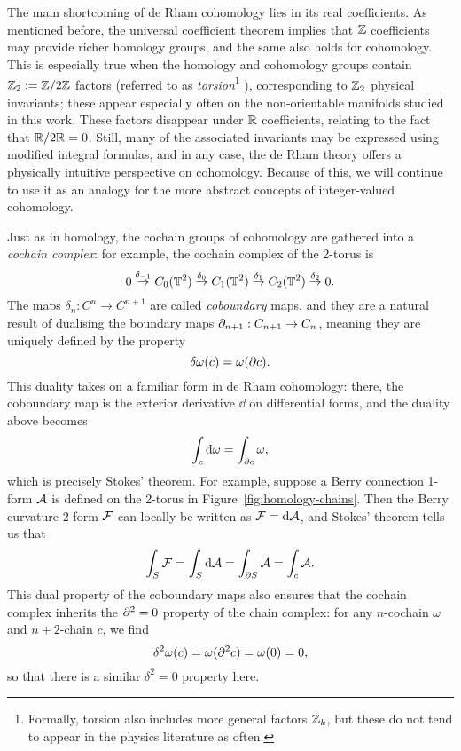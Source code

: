 The main shortcoming of de Rham cohomology lies in its real coefficients. As mentioned before, the universal coefficient theorem implies that $\mathbb{Z}$ coefficients may provide richer homology groups, and the same also holds for cohomology. This is especially true when the homology and cohomology groups contain $\mathbb{Z}_2 := \mathbb{Z}/2\mathbb{Z}$ factors (referred to as \emph{torsion}\footnote{
	Formally, torsion also includes more general factors $\mathbb{Z}_k$, but these do not tend to appear in the physics literature as often.}
), corresponding to $\mathbb{Z}_2$ physical invariants; these appear especially often on the non-orientable manifolds studied in this work. These factors disappear under $\mathbb{R}$ coefficients, relating to the fact that $\mathbb{R}/2\mathbb{R} = 0$. Still, many of the associated invariants may be expressed using modified integral formulas, and in any case, the de Rham theory offers a physically intuitive perspective on cohomology. Because of this, we will continue to use it as an analogy for the more abstract concepts of integer-valued cohomology.

Just as in homology, the cochain groups of cohomology are gathered into a \emph{cochain complex}: for example, the cochain complex of the 2-torus is
\begin{equation*}
	0 \overset{\delta_{-1}}{\rightarrow} C_0(\mathbb{T}^2) \overset{\delta_0}{\rightarrow} C_1(\mathbb{T}^2) \overset{\delta_1}{\rightarrow} C_2(\mathbb{T}^2) \overset{\delta_2}{\rightarrow} 0.
\end{equation*}
The maps $\delta_n: C^n\to C^{n+1}$ are called \emph{coboundary} maps, and they are a natural result of dualising the boundary maps $\partial_{n+1}: C_{n+1}\to C_n$, meaning they are uniquely defined by the property
\begin{equation}\label{eq:boundary-duality}
	\delta\omega(c) = \omega(\partial c).
\end{equation}
This duality takes on a familiar form in de Rham cohomology: there, the coboundary map is the exterior derivative $\dd$ on differential forms, and the duality above becomes
\begin{equation*}
	\int_{c}\dd{\omega} = \int_{\partial c}\omega,
\end{equation*}
which is precisely Stokes' theorem. For example, suppose a Berry connection 1-form $\mathcal{A}$ is defined on the 2-torus in Figure~\ref{fig:homology-chains}. Then the Berry curvature 2-form $\mathcal{F}$ can locally be written as $\mathcal{F} = \dd{\mathcal{A}}$, and Stokes' theorem tells us that
\begin{equation*}
	\int_{S}\mathcal{F} = \int_{S}\dd{\mathcal{A}} = \int_{\partial S}\mathcal{A} = \int_c\mathcal{A}.
\end{equation*}
This dual property of the coboundary maps also ensures that the cochain complex inherits the $\partial^2 = 0$ property of the chain complex: for any $n$-cochain $\omega$ and $n+2$-chain $c$, we find
\begin{equation*}
	\delta^2\omega(c) = \omega(\partial^2 c) = \omega(0) = 0,
\end{equation*}
so that there is a similar $\delta^2=0$ property here.

